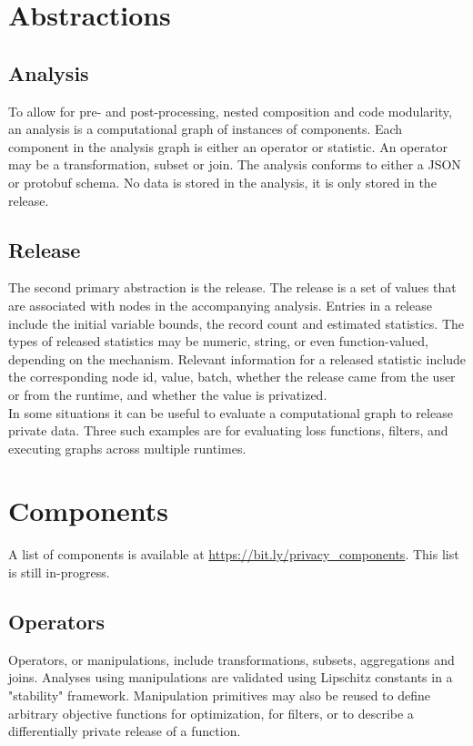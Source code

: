 \documentclass[11pt]{article}
\begin{document}

\section{Abstractions}
\subsection{Analysis}
To allow for pre- and post-processing, nested composition and code modularity, an analysis is a computational graph of instances of components. Each component in the analysis graph is either an operator or statistic. An operator may be a transformation, subset or join. The analysis conforms to either a JSON or protobuf schema. No data is stored in the analysis, it is only stored in the release.

\subsection{Release}
The second primary abstraction is the release. The release is a set of values that are associated with nodes in the accompanying analysis. Entries in a release include the initial variable bounds, the record count and estimated statistics. The types of released statistics may be numeric, string, or even function-valued, depending on the mechanism. Relevant information for a released statistic include the corresponding node id, value, batch, whether the release came from the user or from the runtime, and whether the value is privatized. \\

In some situations it can be useful to evaluate a computational graph to release private data. Three such examples are for evaluating loss functions, filters, and executing graphs across multiple runtimes.

\section{Components}
A list of components is available at \href{https://bit.ly/privacy_components}{https://bit.ly/privacy\_components}. This list is still in-progress.
\subsection{Operators}
Operators, or manipulations, include transformations, subsets, aggregations and joins. Analyses using manipulations are validated using Lipschitz constants in a "stability" framework. Manipulation primitives may also be reused to define arbitrary objective functions for optimization, for filters, or to describe a differentially private release of a function.
\end{document}
